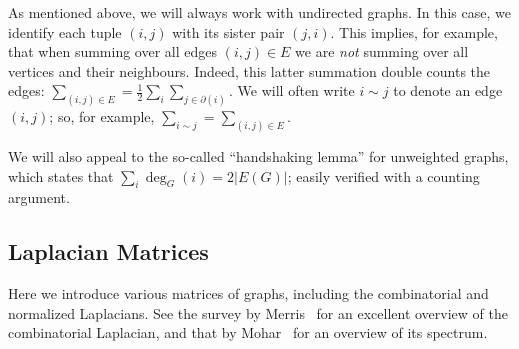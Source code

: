 As mentioned above, we will always  work  with undirected graphs. In this case, we identify each tuple $(i,j)$ with its sister pair $(j,i)$. This implies, for example, that when summing over all edges $(i,j)\in E$ we are \emph{not} summing over all vertices and their neighbours. Indeed, this latter summation double counts the edges: $\sum_{(i,j)\in E}=\frac{1}{2}\sum_{i}\sum_{j\in\partial(i)}$. We will often write $i\sim j$ to denote an edge $(i,j)$; so, for example, $\sum_{i\sim j}=\sum_{(i,j)\in E}$. 

We will also appeal to the so-called ``handshaking lemma'' for unweighted graphs, which states that $\sum_i \deg_G(i) = 2|E(G)|$; easily verified with a counting argument. 


\subsection{Laplacian Matrices}
\label{sec:background_laplacian}
Here we introduce various matrices of graphs, including the combinatorial and normalized Laplacians. See  the survey by Merris~\cite{merris1994laplacian} for an excellent overview of the combinatorial Laplacian, and that by Mohar~\cite{mohar1991laplacian} for an overview of its spectrum. 


